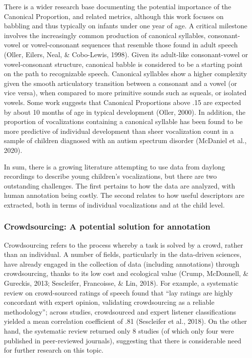 \documentclass[english,,man,floatsintext]{apa6}
\begin{document}
There is a wider research base documenting the potential importance of the Canonical Proportion, and related metrics, although this work focuses on babbling and thus typically on infants under one year of age. A critical milestone involves the increasingly common production of canonical syllables, consonant-vowel or vowel-consonant sequences that resemble those found in adult speech (Oller, Eilers, Neal, \& Cobo-Lewis, 1998). Given its adult-like consonant-vowel or vowel-consonant structure, canonical babble is considered to be a starting point on the path to recognizable speech. Canonical syllables show a higher complexity given the smooth articulatory transition between a consonant and a vowel (or vice versa), when compared to more primitive sounds such as squeals, or isolated vowels. Some work suggests that Canonical Proportions above .15 are expected by about 10 months of age in typical development (Oller, 2000). In addition, the proportion of vocalizations containing a canonical syllable has been found to be more predictive of individual development than sheer vocalization count in a sample of children diagnosed with an autism spectrum disorder (McDaniel et al., 2020).

In sum, there is a growing literature attempting to use data from daylong recordings to describe young children's vocalizations, but there are two outstanding challenges. The first pertains to how the data are analyzed, with human annotation being costly. The second relates to how useful descriptors are extracted, both in terms of individual vocalizations and at the child level.

\hypertarget{crowdsourcing-a-potential-solution-for-annotation}{%
\subsubsection{Crowdsourcing: A potential solution for annotation}\label{crowdsourcing-a-potential-solution-for-annotation}}

Crowdsourcing refers to the process whereby a task is solved by a crowd, rather than an individual. A number of fields, particularly in the data-driven sciences, have already engaged in the collection of data (including annotations) through crowdsourcing, thanks to its low cost and ecological value (Crump, McDonnell, \& Gureckis, 2013; Sescleifer, Francoisse, \& Lin, 2018). For example, a systematic review on crowd-sourced ratings of speech found that \enquote{lay ratings are highly concordant with expert opinion, validating crowdsourcing as a reliable methodology}; across studies, crowdsourced and expert listener classifications yielded a mean correlation coefficient of .81 (Sescleifer et al., 2018). On the other hand, the systematic review returned only 8 studies (of which only four were published in peer-reviewed journals), suggesting that there is considerable need for further research on this topic.
\end{document}
